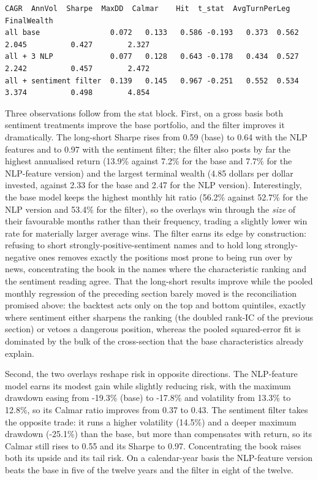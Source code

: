\begin{verbatim}
CAGR  AnnVol  Sharpe  MaxDD  Calmar    Hit  t_stat  AvgTurnPerLeg  FinalWealth
all base                0.072   0.133   0.586 -0.193   0.373  0.562   2.045          0.427        2.327
all + 3 NLP             0.077   0.128   0.643 -0.178   0.434  0.527   2.242          0.457        2.472
all + sentiment filter  0.139   0.145   0.967 -0.251   0.552  0.534   3.374          0.498        4.854
\end{verbatim}

Three observations follow from the stat block. First, on a gross basis both sentiment treatments improve the base portfolio, and the filter improves it dramatically. The long-short Sharpe rises from 0.59 (base) to 0.64 with the NLP features and to 0.97 with the sentiment filter; the filter also posts by far the highest annualised return (13.9\% against 7.2\% for the base and 7.7\% for the NLP-feature version) and the largest terminal wealth (4.85 dollars per dollar invested, against 2.33 for the base and 2.47 for the NLP version). Interestingly, the base model keeps the highest monthly hit ratio (56.2\% against 52.7\% for the NLP version and 53.4\% for the filter), so the overlays win through the \textit{size} of their favourable months rather than their frequency, trading a slightly lower win rate for materially larger average wins. The filter earns its edge by construction: refusing to short strongly-positive-sentiment names and to hold long strongly-negative ones removes exactly the positions most prone to being run over by news, concentrating the book in the names where the characteristic ranking and the sentiment reading agree. That the long-short results improve while the pooled monthly regression of the preceding section barely moved is the reconciliation promised above: the backtest acts only on the top and bottom quintiles, exactly where sentiment either sharpens the ranking (the doubled rank-IC of the previous section) or vetoes a dangerous position, whereas the pooled squared-error fit is dominated by the bulk of the cross-section that the base characteristics already explain.

Second, the two overlays reshape risk in opposite directions. The NLP-feature model earns its modest gain while slightly reducing risk, with the maximum drawdown easing from -19.3\% (base) to -17.8\% and volatility from 13.3\% to 12.8\%, so its Calmar ratio improves from 0.37 to 0.43. The sentiment filter takes the opposite trade: it runs a higher volatility (14.5\%) and a deeper maximum drawdown (-25.1\%) than the base, but more than compensates with return, so its Calmar still rises to 0.55 and its Sharpe to 0.97. Concentrating the book raises both its upside and its tail risk. On a calendar-year basis the NLP-feature version beats the base in five of the twelve years and the filter in eight of the twelve.

